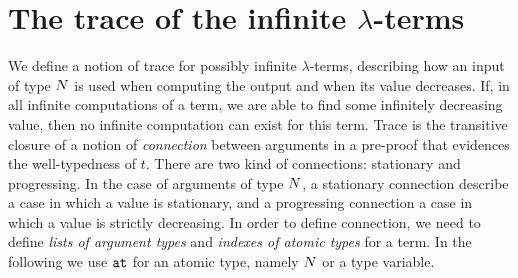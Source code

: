 \section{The trace of the infinite $\lambda$-terms}\label{section-trace-infinite-lambda-terms}


We define a notion of trace for possibly infinite $\lambda$-terms, 
describing how an input of type ${N}$ is used when computing the output
and when its value decreases. 
If, in all infinite computations of a term, we are able to find some infinitely
decreasing value, then no infinite computation can exist for this term. 
Trace is the transitive closure of a notion of \emph{connection} 
between arguments in a pre-proof that evidences the well-typedness of $t$. 
There are two kind of connections: stationary and progressing.
In the case of arguments of type ${N}$, a stationary connection 
describe a case in which a value is stationary, and a progressing connection 
a case in which a value is strictly decreasing.
In order to define connection, we need to define \emph{lists of argument types} 
and \emph{indexes of atomic types} for a term.
In the following we use ${\tt at}$ for an atomic type, namely ${N}$ or a type variable. 

%
%


